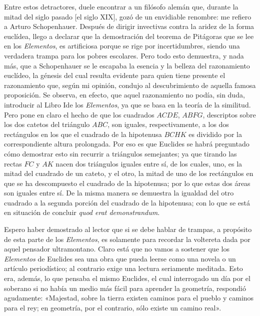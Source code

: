 \documentclass[a4paper, 12pt, draft]{article}
\begin{document}
{Entre estos detractores, duele encontrar a un filósofo alemán que, durante la mitad del siglo pasado [el siglo XIX], gozó de un envidiable renombre: me refiero a Arturo  Schopenhauer. Después de dirigir invectivas contra la aridez de la forma euclídea, llego a declarar que la demostración del teorema de Pitágoras que se lee en los \textit{ Elementos}, es artificiosa porque se rige por incertidumbres, siendo una verdadera trampa para los pobres escolares. Pero todo esto demuestra, y nada más, que a Schopenhauer se le escapaba la esencia y la belleza del razonamiento euclídeo, la génesis del cual resulta evidente para quien tiene presente el razonamiento que, según mi opinión, condujo al descubrimiento de aquella famosa proposición. Se observa, en efecto, que aquel razonamiento no podía, sin duda, introducir al Libro Ide los \textit{ Elementos}, ya que se basa en la teoría de la similitud. Pero pone en claro el hecho de que los cuadrados $ACDE$, $ABFG$, descriptos sobre los dos catetos del triángulo $ABC$, son iguales, respectivamente, a los dos rectángulos en los que el cuadrado de la hipotenusa $BCHK$ es dividido por la correspondiente altura prolongada. Por eso es que Euclides se habrá preguntado cómo demostrar esto sin recurrir a triángulos semejantes; ya que tirando las rectas $FC$ y $AK$ nacen dos triángulos iguales entre sí, de los cuales, uno, es la mitad del cuadrado de un cateto, y el otro, la mitad de uno de los rectángulos en que se ha descompuesto el cuadrado de la hipotenusa; por lo que estas dos áreas son iguales entre sí. De la misma manera se demuestra la igualdad del otro cuadrado a la segunda porción del cuadrado de la hipotenusa; con lo que se está en situación de concluir \textit{ quod erat demonstrandum}.

Espero haber demostrado al lector que si se debe hablar de trampas, a propósito de esta parte de los \textit{ Elementos}, es solamente para recordar la voltereta dada por aquel pensador ultramontano. Claro está que no vamos a sostener que los \textit{ Elementos} de Euclides sea una obra que pueda leerse como una novela o un artículo periodístico; al contrario exige una lectura seriamente meditada. Esto era, además, lo que pensaba el mismo Euclides, el cual interrogado un día por el soberano si no había un medio más fácil para aprender la geometría, respondió agudamente: «Majestad, sobre la tierra existen caminos para el pueblo y caminos para el rey; en geometría, por el contrario, sólo existe un camino real».


}
\end{document}
